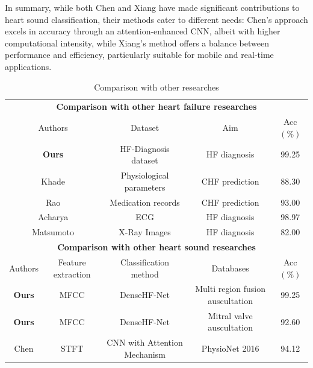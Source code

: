 In summary, while both Chen and Xiang have made significant contributions to heart sound classification, their methods cater to different needs: Chen's approach excels in accuracy through an attention-enhanced CNN, albeit with higher computational intensity, while Xiang's method offers a balance between performance and efficiency, particularly suitable for mobile and real-time applications.



\begin{table}[h]
 \caption{Comparison with other researches}
  \label{tab:Comparison}
    \centering
    \begin{tabularx}{\textwidth}{ccccc}
        \toprule
        \multicolumn{5}{c}{\textbf{Comparison with other heart failure researches}}\\
        \multicolumn{2}{c}{Authors} & \multicolumn{1}{c}{Dataset} & \multicolumn{1}{c}{Aim} & \multicolumn{1}{c}{Acc$(\%)$} \\
        \midrule
        \multicolumn{2}{c}{\textbf{Ours}} & \multicolumn{1}{c}{HF-Diagnosis dataset} & \multicolumn{1}{c}{HF diagnosis} & 99.25 \\
        \multicolumn{2}{c}{Khade \cite{khade2019system}} & \multicolumn{1}{c}{Physiological parameters} & \multicolumn{1}{c}{CHF prediction} & 88.30 \\
        \multicolumn{2}{c}{Rao \cite{rao2022explainable}} & \multicolumn{1}{c}{Medication records} & \multicolumn{1}{c}{CHF prediction} & 93.00 \\
        \multicolumn{2}{c}{Acharya \cite{acharya2019deep}} & \multicolumn{1}{c}{ECG} & \multicolumn{1}{c}{HF diagnosis} & 98.97 \\
        \multicolumn{2}{c}{Matsumoto \cite{matsumoto2020diagnosing}} & \multicolumn{1}{c}{X-Ray Images} & \multicolumn{1}{c}{HF diagnosis} & 82.00 \\
        \midrule
        \multicolumn{5}{c}{\textbf{Comparison with other heart sound researches}}\\
        Authors & Feature extraction & Classification method & Databases & Acc$(\%)$ \\
        \midrule
        \textbf{Ours} & MFCC & DenseHF-Net & Multi region fusion auscultation & 99.25 \\
        \textbf{Ours} & MFCC & DenseHF-Net & Mitral valve auscultation & 92.60 \\
        Chen \cite{chen2023robust} & STFT & CNN with Attention Mechanism & PhysioNet 2016 & 94.12 \\

\end{tabularx}
\end{table}
